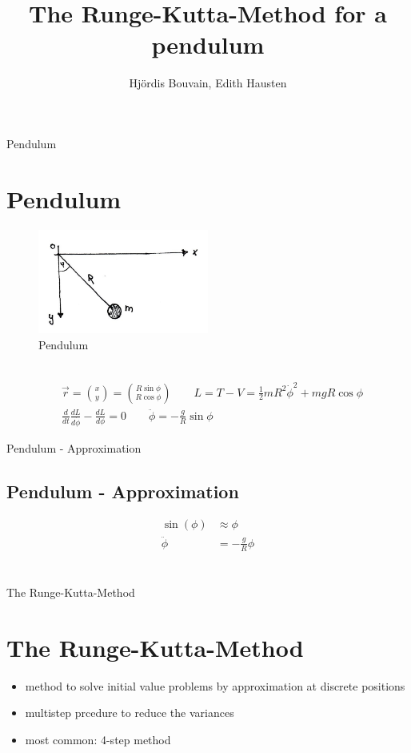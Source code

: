 \documentclass[9pt]{beamer}
\author{Hjördis Bouvain, Edith Hausten}
\title{The Runge-Kutta-Method for a pendulum}
\begin{document}
\begin{frame}
\titlepage
\end{frame}

\begin{frame}
\tableofcontents
\end{frame}

\begin{frame}{Pendulum}
\section{Pendulum}
\begin{figure}
\centering
	\includegraphics[width=0.5\textwidth]{Pendel.jpg}
	\caption{Pendulum}
\end{figure}
\\
\begin{align*}
&\vec{r} = {x \choose y} = {R\sin\phi \choose R\cos\phi} \qquad L = T-V = \frac{1}{2}mR^2\dot{\phi}^2+mgR\cos\phi 
\\
&\frac{d}{dt}\frac{dL}{d\dot{\phi}}-\frac{dL}{d\phi}=0 \qquad\ddot{\phi}=-\frac{g}{R}\sin{\phi}
\end{align*}
\end{frame}

\begin{frame}{Pendulum - Approximation}
\subsection{Pendulum - Approximation}
\begin{align*}
\sin(\phi) &\approx \phi \\
\ddot{\phi} &= -\frac{g}{R}\phi \\ 
\end{align*}
\\
\begin{center}
\textbf{}
\end{center}
\end{frame}

\begin{frame}{The Runge-Kutta-Method}
\section{The Runge-Kutta-Method}
\begin{itemize}
\item method to solve initial value problems by approximation at discrete positions \\
\item multistep prcedure to reduce the variances
\item most common: 4-step method 
\end{itemize}
\end{frame}
\end{document}

